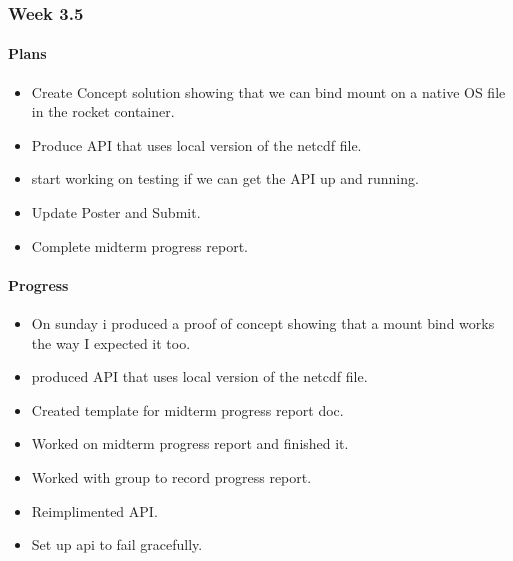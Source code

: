 \documentclass[onecolumn, draftclsnofoot,10pt, compsoc]{article}
\begin{document}
		\subsubsection{Week 3.5}
		    \paragraph{Plans} \hfill \break
		        \begin{itemize}
		            \item Create Concept solution showing that we can bind mount on a native OS file in the rocket container.\\
		            \item Produce API that uses local version of the netcdf file.\\
		            \item start working on testing if we can get the API up and running.\\
		            \item Update Poster and Submit.\\
		            \item Complete midterm progress report.\\
		        \end{itemize}
		    \paragraph{Progress} \hfill \break
		        \begin{itemize}
		            \item On sunday i produced a proof of concept showing that a mount bind works the way I expected it too.\\
		            \item produced API that uses local version of the netcdf file.\\
		            \item Created template for midterm progress report doc.\\
		            \item Worked on midterm progress report and finished it.\\
		            \item Worked with group to record progress report.\\
		            \item Reimplimented API.\\
		            \item Set up api to fail gracefully.\\
		        \end{itemize}
\end{document}

